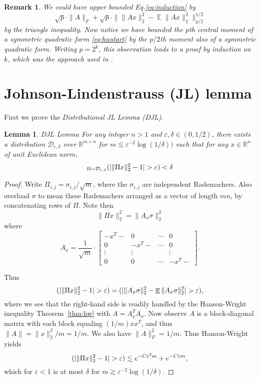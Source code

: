 \documentclass[12pt]{article}
\DeclareMathOperator*{\E}{\mathbb{E}}
\let\Pr\relax
\DeclareMathOperator*{\Pr}{\mathbb{P}}
\newcommand{\eps}{\varepsilon}
\newcommand{\R}{\mathbb{R}}
\newtheorem{remark}{Remark}
\newtheorem{lemma}{Lemma}
\newcommand{\EquationName}[1]{\label{eq:#1}}
\newcommand{\Equation}[1]{Eq.\:\eqref{eq:#1}}
\newcommand{\Theorem}[1]{Theorem~\ref{thm:#1}}
\newcommand{\Eqsub}[1]{\eqref{eq:#1}}
\begin{document}
\begin{remark}
\textup{
We could have upper bounded \Equation{induction} by 
$$
\sqrt{p}\cdot \|A\|_F + \sqrt{p}\cdot \| \|Ax\|_2^2 - \E\|Ax\|_2^2\|_{p/2}^{1/2}
$$
by the triangle inequality. Now notice we have bounded the $p$th central moment of a symmetric quadratic form \Eqsub{hwstart} by the $p/2$th moment also of a symmetric quadratic form. Writing $p = 2^k$, this observation leads to a proof by induction on $k$, which was the approach used in \cite{DiakonikolasKN10}.
}
\end{remark}

\section{Johnson-Lindenstrauss (JL) lemma}

First we prove the {\it Distributional JL Lemma (DJL)}.

\begin{lemma}{DJL Lemma}
For any integer $n > 1$ and $\eps,\delta\in (0, 1/2)$, there exists a distribution $\mathcal{D}_{\eps, \delta}$ over $\R^{m\times n}$ for $m \lesssim \eps^{-2}\log(1/\delta))$ such that for any $x\in\R^n$ of unit Euclidean norm,
$$
\Pr_{\Pi\sim\mathcal{D}_{\eps,\delta}}(| \|\Pi x\|_2^2 - 1 | > \eps ) < \delta
$$
\end{lemma}
\begin{proof}
Write $\Pi_{i,j} = \sigma_{i,j}/\sqrt{m}$, where the $\sigma_{i,j}$ are independent Rademachers. Also overload  $\sigma$ to mean these Rademachers arranged as a vector of length $mn$, by concatenating rows of $\Pi$. Note then
$$
\|\Pi x\|_2^2 = \|A_x\sigma\|_2^2
$$
where
\begin{equation}
A_x = \frac 1{\sqrt{m}}\cdot \begin{bmatrix} 
- x^T - & 0 & \cdots & 0\\
0 & - x^T - & \cdots & 0\\
\vdots &\vdots &  &\vdots\\
0&0&\cdots& - x^T -
\end{bmatrix} . \EquationName{xmatrix}
\end{equation}

Thus
$$
\Pr(| \|\Pi x\|_2^2 - 1| > \eps) = \Pr(| \|A_x\sigma\|_2^2 - \E \|A_x\sigma\|_2^2 | > \eps) ,
$$
where we see that the right-hand side is readily handled by the Hanson-Wright inequality \Theorem{hw} with $A = A_x^T A_x$. Now observe $A$ is a block-diagonal matrix with each block equaling $(1/m)xx^T$, and thus $\|A\| = \|x\|_2^2 / m = 1/m$. We also have $\|A\|_F^2 = 1/m$. Thus Hanson-Wright yields
$$
\Pr(| \|\Pi x\|_2 ^2 - 1| > \eps) \lesssim e^{-C\eps^2 m} + e^{-C\eps m} ,
$$
which for $\eps < 1$ is at most $\delta$ for $m \gtrsim \eps^{-2}\log(1/\delta)$.
\end{proof}
\end{document}
